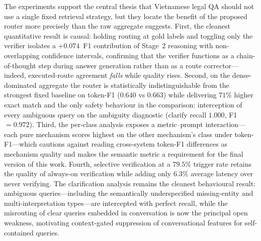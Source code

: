 The experiments support the central thesis that Vietnamese legal QA should not
use a single fixed retrieval strategy, but they locate the benefit of the
proposed router more precisely than the raw aggregate suggests. First, the
cleanest quantitative result is causal: holding routing at gold labels and
toggling only the verifier isolates a $+0.074$~F1 contribution of Stage~2
reasoning with non-overlapping confidence intervals, confirming that the
verifier functions as a chain-of-thought step during answer generation rather
than as a route corrector---indeed, executed-route agreement \emph{falls}
while quality rises. Second, on the dense-dominated aggregate the router is
statistically indistinguishable from the strongest fixed baseline on token-F1
($0.640$ vs $0.663$) while delivering $71\%$ higher exact match and the only
safety behaviour in the comparison: interception of every ambiguous query on
the ambiguity diagnostic (clarify recall $1.000$, F1~$=0.972$). Third, the per-class analysis exposes a
metric--prompt interaction---each pure mechanism scores highest on the other
mechanism's class under token-F1---which cautions against reading
cross-system token-F1 differences as mechanism quality and makes the semantic
metric a requirement for the final version of this work. Fourth, selective
verification at a $79.5\%$ trigger rate retains the quality of always-on
verification while adding only $6.3\%$ average latency over never verifying.
The clarification analysis remains the cleanest behavioural result:
ambiguous queries---including the semantically underspecified missing-entity
and multi-interpretation types---are intercepted with perfect recall, while
the misrouting of clear queries embedded in conversation is now the principal
open weakness, motivating context-gated suppression of conversational
features for self-contained queries.